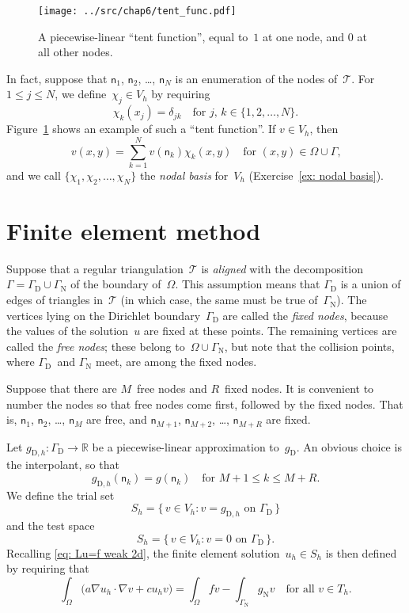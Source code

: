 \begin{figure}
\caption{A piecewise-linear ``tent function'', equal to~$1$ at one node, and 
$0$ at all other nodes.}\label{fig: tent func}
\begin{center}
\texttt{[image: ../src/chap6/tent\_func.pdf]}
\end{center}
\end{figure}

In fact, suppose that $\mathsf{n}_1$, $\mathsf{n}_2$, \dots, $\mathsf{n}_N$ is 
an enumeration of the nodes of~$\mathcal{T}$.  For~$1\le j\le N$, we 
define~$\chi_j\in V_h$ by requiring
\[
\chi_k(x_j)=\delta_{jk}\quad\text{for $j$, $k\in\{1, 2, \dots, N\}$.}
\]
Figure~\ref{fig: tent func} shows an example of such a ``tent function''.  
If $v\in V_h$, then
\[
v(x,y)=\sum_{k=1}^N v(\mathsf{n}_k)\chi_k(x,y)
	\quad\text{for $(x,y)\in\Omega\cup\Gamma$,}
\]
and we call $\{\chi_1,\chi_2,\ldots,\chi_N\}$ the \emph{nodal basis} for~$V_h$
(Exercise~\ref{ex: nodal basis}).

\section{Finite element method}

Suppose that a regular triangulation~$\mathcal{T}$ is \emph{aligned} with 
the decomposition $\Gamma=\Gamma_{\mathrm{D}}\cup\Gamma_{\mathrm{N}}$ of the 
boundary of~$\Omega$.  This assumption means that $\Gamma_{\mathrm{D}}$ 
is a union of edges of triangles in~$\mathcal{T}$ (in which 
case, the same must be true of~$\Gamma_{\mathrm{N}}$).  The vertices lying on 
the Dirichlet boundary~$\Gamma_{\mathrm{D}}$ are called the \emph{fixed nodes}, 
because the values of the solution~$u$ are fixed at these points.  The 
remaining vertices are called the \emph{free nodes}; these belong 
to~$\Omega\cup\Gamma_{\mathrm{N}}$, but note that the collision points, where
$\Gamma_{\mathrm{D}}$~and $\Gamma_{\mathrm{N}}$ meet, are among the fixed nodes.

Suppose that there are $M$~free nodes and $R$~fixed nodes. It is convenient to 
number the nodes so that free nodes come first, followed by the fixed nodes.
That is, $\mathsf{n}_1$, $\mathsf{n}_2$, \dots, 
$\mathsf{n}_M$ are free, and $\mathsf{n}_{M+1}$, $\mathsf{n}_{M+2}$, \dots, 
$\mathsf{n}_{M+R}$ are fixed.  

Let $g_{\mathrm{D},h}:\Gamma_{\mathrm{D}}\to\mathbb{R}$ be a piecewise-linear 
approximation to~$g_{\mathrm{D}}$.  An obvious choice is the interpolant, so
that
\[
g_{\mathrm{D},h}(\mathsf{n}_k)=g(\mathsf{n}_k)\quad\text{for $M+1\le k\le M+R$.}
\]
We define the trial set
\[
S_h=\{\,v\in V_h:\text{$v=g_{\mathrm{D},h}$ on $\Gamma_{\mathrm{D}}$}\,\}
\]
and the test space
\[
S_h=\{\,v\in V_h:\text{$v=0$ on $\Gamma_{\mathrm{D}}$}\,\}.
\]
Recalling \eqref{eq: Lu=f weak 2d}, the finite element 
solution~$u_h\in S_h$ is then defined by requiring that
\begin{equation}\label{eq: FEM 2d}
\int_\Omega\bigl(a\nabla u_h\cdot\nabla v+cu_hv\bigr)=\int_\Omega fv
	-\int_{\Gamma_{\mathrm{N}}}g_{\mathrm{N}}v
	\quad\text{for all $v\in T_h$.}
\end{equation}

